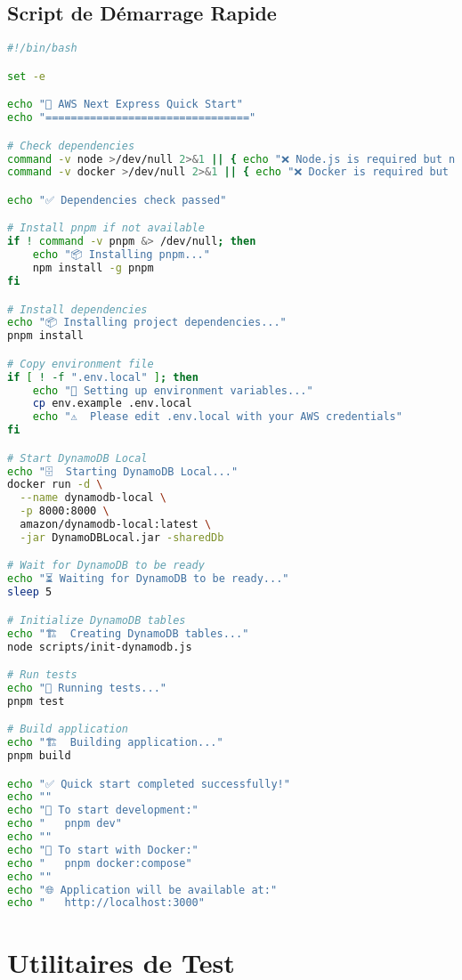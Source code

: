 \subsection{Script de Démarrage Rapide}

\begin{lstlisting}[language=bash, caption=scripts/quick-start.sh]
#!/bin/bash

set -e

echo "🚀 AWS Next Express Quick Start"
echo "================================"

# Check dependencies
command -v node >/dev/null 2>&1 || { echo "❌ Node.js is required but not installed. Aborting." >&2; exit 1; }
command -v docker >/dev/null 2>&1 || { echo "❌ Docker is required but not installed. Aborting." >&2; exit 1; }

echo "✅ Dependencies check passed"

# Install pnpm if not available
if ! command -v pnpm &> /dev/null; then
    echo "📦 Installing pnpm..."
    npm install -g pnpm
fi

# Install dependencies
echo "📦 Installing project dependencies..."
pnpm install

# Copy environment file
if [ ! -f ".env.local" ]; then
    echo "🔧 Setting up environment variables..."
    cp env.example .env.local
    echo "⚠️  Please edit .env.local with your AWS credentials"
fi

# Start DynamoDB Local
echo "🗄️  Starting DynamoDB Local..."
docker run -d \
  --name dynamodb-local \
  -p 8000:8000 \
  amazon/dynamodb-local:latest \
  -jar DynamoDBLocal.jar -sharedDb

# Wait for DynamoDB to be ready
echo "⏳ Waiting for DynamoDB to be ready..."
sleep 5

# Initialize DynamoDB tables
echo "🏗️  Creating DynamoDB tables..."
node scripts/init-dynamodb.js

# Run tests
echo "🧪 Running tests..."
pnpm test

# Build application
echo "🏗️  Building application..."
pnpm build

echo "✅ Quick start completed successfully!"
echo ""
echo "🚀 To start development:"
echo "   pnpm dev"
echo ""
echo "🐳 To start with Docker:"
echo "   pnpm docker:compose"
echo ""
echo "🌐 Application will be available at:"
echo "   http://localhost:3000"
\end{lstlisting}

\section{Utilitaires de Test}

